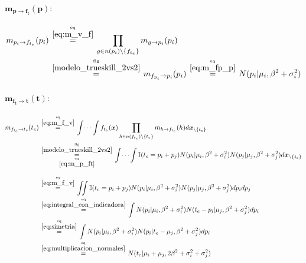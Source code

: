 \documentclass[article]{jss}
\newcommand\hfrac[2]{\genfrac{}{}{0pt}{}{#1}{#2}} %
\begin{document}
\begin{appendix}
\paragraph{$\bm{m_{p \rightarrow f_t}(p)}:$}

\begin{equation}\label{eq:m_p_ft}
\begin{split}
 m_{p_i \rightarrow f_{t_e}}(p_i) & \overset{\hfrac{\text{eq}}{\ref{eq:m_v_f}}}{=} \prod_{g \in n(p_i) \setminus  \{f_{t_e} \}} m_{g \rightarrow p_i} (p_i) \\
 & \overset{\hfrac{\text{fig}}{\ref{modelo_trueskill_2vs2}}}{=} m_{f_{p_i} \rightarrow p_i}(p_i) \overset{\hfrac{\text{eq}}{\ref{eq:m_fp_p}}}{=} N(p_i|\mu_i,\beta^2 + \sigma_i^2)
\end{split}
\end{equation}

\paragraph{$\bm{m_{f_t \rightarrow t}(t)}:$}

\begin{equation}
\begin{split}
 m_{f_{t_e} \rightarrow t_e}(t_e) & \overset{\hfrac{\text{eq}}{\ref{eq:m_f_v}}}{=} \int \dots \int f_{t_e}(\bm{x}) \prod_{h \in n(f_{t_e}) \setminus \{t_e\} } m_{h \rightarrow f_{t_e}}(h) d\bm{x}_{\setminus \{t_e\} }  \\
 & \overset{\hfrac{\text{fig}}{\ref{modelo_trueskill_2vs2}}}{\underset{\hfrac{\text{eq}}{\ref{eq:m_p_ft}}}{=}} \int \dots \int \mathbb{I}(t_e = p_i + p_j) N(p_i|\mu_i,\beta^2 + \sigma_i^2)N(p_j|\mu_j,\beta^2 + \sigma_j^2) d\bm{x}_{\setminus \{t_e\} }\\[0.3cm]
 & \overset{\hfrac{\text{eq}}{\ref{eq:m_f_v}}}{=} \iint \mathbb{I}(t_e = p_i + p_j) N(p_i|\mu_i,\beta^2 + \sigma_i^2)N(p_j|\mu_j,\beta^2 + \sigma_j^2) dp_idp_j \\
 & \overset{\hfrac{\text{eq}}{\ref{eq:integral_con_indicadora}}}{=} \int N(p_i|\mu_i,\beta^2 + \sigma_i^2) N(t_e - p_i|\mu_j,\beta^2 + \sigma_j^2) dp_i   \\
 & \overset{\hfrac{\text{eq}}{\ref{eq:simetria}}}{=} \int N(p_i|\mu_i,\beta^2 + \sigma_i^2) N(p_i|t_e - \mu_j,\beta^2 + \sigma_j^2) dp_i \\
 & \overset{\hfrac{\text{eq}}{\ref{eq:multiplicacion_normales}}}{=} N(t_e|\mu_i+\mu_j,2\beta^2 + \sigma_i^2 + \sigma_j^2)
\end{split}
\end{equation}


\end{appendix}
\end{document}
